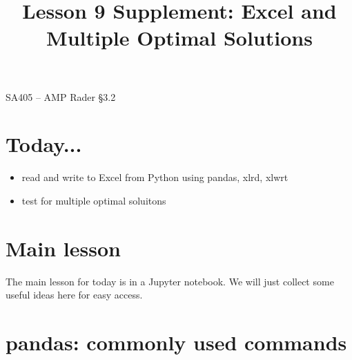 \documentclass[11pt]{article}
\makeatletter
\theoremstyle{definition}
\renewcommand{\maketitle}{
  \noindent SA405 -- AMP \hfill Rader \S 3.2 \\

  \begin{center}\Large{\textbf{\@title}}\end{center}
}
\makeatother
\begin{document}
  
\title{Lesson 9 Supplement:  Excel and Multiple Optimal Solutions}

\maketitle

\section{Today...}

\begin{itemize}
	\item  read and write to Excel from Python using pandas, xlrd, xlwrt
	\item  test for multiple optimal soluitons
\end{itemize}

\section{Main lesson}
The main lesson for today is in a Jupyter notebook.  We will just collect some useful ideas here for easy access.

\section{pandas: commonly used commands}
\end{document}
